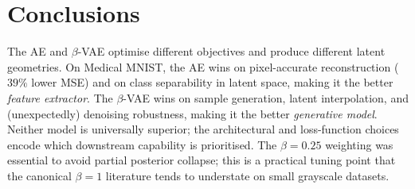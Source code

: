 \documentclass[10pt,a4paper,twocolumn]{article}
\begin{document}
\section{Conclusions}
The AE and $\beta$-VAE optimise different objectives and produce different latent geometries. On Medical MNIST, the AE wins on pixel-accurate reconstruction ($39\%$ lower MSE) and on class separability in latent space, making it the better \emph{feature extractor}. The $\beta$-VAE wins on sample generation, latent interpolation, and (unexpectedly) denoising robustness, making it the better \emph{generative model}. Neither model is universally superior; the architectural and loss-function choices encode which downstream capability is prioritised. The $\beta{=}0.25$ weighting was essential to avoid partial posterior collapse; this is a practical tuning point that the canonical $\beta{=}1$ literature tends to understate on small grayscale datasets.
\end{document}
